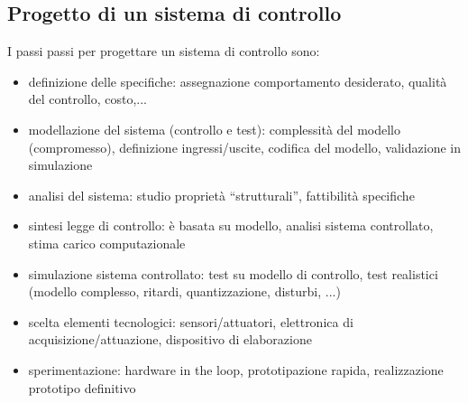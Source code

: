 \documentclass{article}
\numberwithin{equation}{subsection}
\let\oldsubsection\subsection%
\renewcommand{\subsection}{%
  \renewcommand{\theequation}{\thesubsection.\arabic{equation}}%
  \oldsubsection}%
\begin{document}
\subsection{Progetto di un sistema di controllo}
I passi passi per progettare un sistema di controllo sono:
\begin{itemize}
    \item definizione delle specifiche: assegnazione comportamento  desiderato, qualità del controllo, costo,...
    \item modellazione del sistema (controllo e test): complessità del modello (compromesso), definizione ingressi/uscite, codifica del modello, validazione in simulazione
    \item analisi del sistema: studio proprietà “strutturali”, fattibilità specifiche
    \item sintesi legge di controllo: è basata su modello, analisi sistema controllato, stima carico computazionale
    \item simulazione sistema controllato: test su modello di controllo, test realistici (modello complesso, ritardi, quantizzazione, disturbi, ...)
    \item scelta elementi tecnologici: sensori/attuatori, elettronica di acquisizione/attuazione, dispositivo di elaborazione
    \item sperimentazione: hardware in the loop, prototipazione rapida, realizzazione prototipo definitivo
\end{itemize}
\end{document}
